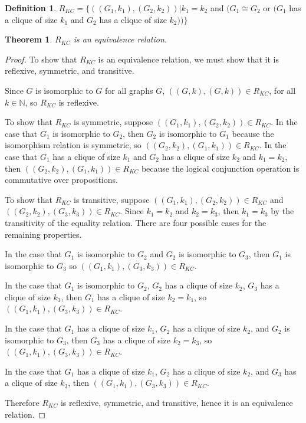 \documentclass{amsart}
\newtheorem{theorem}{Theorem}[section]
\theoremstyle{definition} \newtheorem{definition}[definition]{Definition}
\begin{document}
\begin{definition}
  $R_{KC}=\{((G_1, k_1), (G_2, k_2))| k_1=k_2$ and $(G_1\cong G_2$ or $(G_1$
  has a clique of size $k_1$ and $G_2$ has a clique of size $k_2))\}$
\end{definition}

\begin{theorem}$R_{KC}$ is an equivalence relation.\end{theorem}
\begin{proof}To show that $R_{KC}$ is an equivalence relation, we must show
  that it is reflexive, symmetric, and transitive.

  Since $G$ is isomorphic to $G$ for all graphs $G$, $((G,k),(G,k))\in R_{KC}$,
  for all $k\in\mathbb{N}$, so $R_{KC}$ is reflexive.

  To show that $R_{KC}$ is symmetric, suppose $((G_1, k_1), (G_2, k_2))\in
  R_{KC}$. In the case that $G_1$ is isomorphic to $G_2$, then $G_2$ is
  isomorphic to $G_1$ because the isomorphism relation is symmetric, so
  $((G_2,k_2),(G_1,k_1))\in R_{KC}$. In the case that $G_1$ has a clique of
  size $k_1$ and $G_2$ has a clique of size $k_2$ and $k_1=k_2$, then
  $((G_2,k_2),(G_1,k_1))\in R_{KC}$ because the logical conjunction operation
  is commutative over propositions.

  To show that $R_{KC}$ is transitive, suppose $((G_1, k_1), (G_2, k_2))\in
  R_{KC}$ and $((G_2, k_2), (G_3, k_3))\in R_{KC}$. Since $k_1=k_2$ and
  $k_2=k_3$, then $k_1=k_3$ by the transitivity of the equality relation. There
  are four possible cases for the remaining properties.

  In the case that $G_1$ is isomorphic to $G_2$ and $G_2$ is isomorphic to
  $G_3$, then $G_1$ is isomorphic to $G_3$ so $((G_1, k_1), (G_3, k_3))\in
  R_{KC}$.

  In the case that $G_1$ is isomorphic to $G_2$, $G_2$ has a clique of size
  $k_2$, $G_3$ has a clique of size $k_3$, then $G_1$ has a clique of size
  $k_2=k_1$, so $((G_1, k_1), (G_3, k_3))\in R_{KC}$.

  In the case that $G_1$ has a clique of size $k_1$, $G_2$ has a clique of size
  $k_2$, and $G_2$ is isomorphic to $G_3$, then $G_3$ has a clique
  of size $k_2=k_3$, so $((G_1, k_1), (G_3, k_3))\in R_{KC}$.

  In the case that $G_1$ has a clique of size $k_1$, $G_2$ has a clique of size
  $k_2$, and $G_3$ has a clique of size $k_3$, then $((G_1, k_1), (G_3,
  k_3))\in R_{KC}$.

  Therefore $R_{KC}$ is reflexive, symmetric, and transitive, hence it is an
  equivalence relation.
\end{proof}
\end{document}
